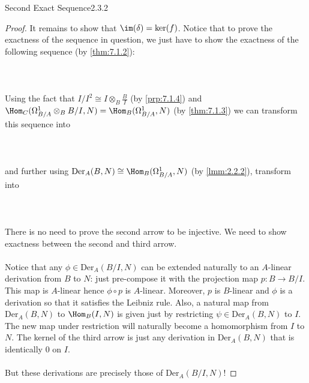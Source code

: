 \documentclass[a4paper]{article}
\begin{document}
\begin{thm}{Second Exact Sequence}{2.3.2}
\begin{proof}
It remains to show that $\im(\delta)=\ker(f)$. Notice that to prove the exactness of the sequence in question, we just have to show the exactness of the following sequence (by \ref{thm:7.1.2}): \\~\\
\\~\\
Using the fact that $I/I^2\cong I\otimes_B\frac{B}{I}$ (by \ref{prp:7.1.4}) and $\Hom_C(\Omega_{B/A}^1\otimes_BB/I,N)=\Hom_B(\Omega_{B/A}^1,N)$ (by \ref{thm:7.1.3}) we can transform this sequence into \\~\\
\\~\\
and further using $\text{Der}_A(B,N)\cong\Hom_B(\Omega_{B/A}^1,N)$ (by \ref{lmm:2.2.2}), transform into \\~\\
\\~\\
There is no need to prove the second arrow to be injective. We need to show exactness between the second and third arrow. \\~\\

Notice that any $\phi\in\text{Der}_A(B/I,N)$ can be extended naturally to an $A$-linear derivation from $B$ to $N$: just pre-compose it with the projection map $p:B\to B/I$. This map is $A$-linear hence $\phi\circ p$ is $A$-linear. Moreover, $p$ is $B$-linear and $\phi$ is a derivation so that it satisfies the Leibniz rule. Also, a natural map from $\text{Der}_A(B,N)$ to $\Hom_B(I,N)$ is given just by restricting $\psi\in\text{Der}_A(B,N)$ to $I$. The new map under restriction will naturally become a homomorphism from $I$ to $N$. The kernel of the third arrow is just any derivation in $\text{Der}_A(B,N)$ that is identically $0$ on $I$. \\~\\
But these derivations are precisely those of $\text{Der}_A(B/I,N)$! 
\end{proof}
\end{thm}
\end{document}
